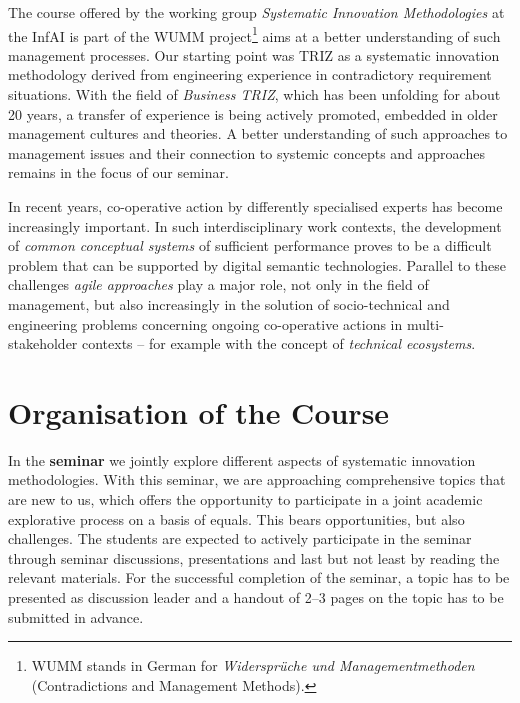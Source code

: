 \documentclass[11pt,a4paper]{article}
\begin{document}
The course offered by the working group \emph{Systematic Innovation
  Methodologies} at the InfAI is part of the WUMM project\footnote{WUMM stands
  in German for \emph{Widersprüche und Managementmethoden} (Contradictions and
  Management Methods).} aims at a better understanding of such management
processes. Our starting point was TRIZ as a systematic innovation methodology
derived from engineering experience in contradictory requirement situations.
With the field of \emph{Business TRIZ}, which has been unfolding for about 20
years, a transfer of experience is being actively promoted, embedded in older
management cultures and theories.  A better understanding of such approaches
to management issues and their connection to systemic concepts and approaches
remains in the focus of our seminar.

In recent years, co-operative action by differently specialised experts has
become increasingly important.  In such interdisciplinary work contexts, the
development of \emph{common conceptual systems} of sufficient performance
proves to be a difficult problem that can be supported by digital semantic
technologies.  Parallel to these challenges \emph{agile approaches} play a
major role, not only in the field of management, but also increasingly in the
solution of socio-technical and engineering problems concerning ongoing
co-operative actions in multi-stakeholder contexts -- for example with the
concept of \emph{technical ecosystems}.

\section{Organisation of the Course}

In the \textbf{seminar} we jointly explore different aspects of systematic
innovation methodologies.  With this seminar, we are approaching comprehensive
topics that are new to us, which offers the opportunity to participate in a
joint academic explorative process on a basis of equals. This bears
opportunities, but also challenges.  The students are expected to actively
participate in the seminar through seminar discussions, presentations and last
but not least by reading the relevant materials.  For the successful
completion of the seminar, a topic has to be presented as discussion leader
and a handout of 2--3 pages on the topic has to be submitted in advance.
\end{document}
